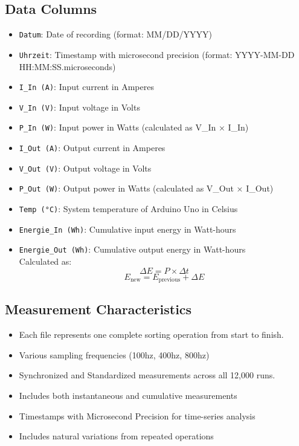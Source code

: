 \documentclass{article}
\begin{document}
\subsection{Data Columns}

\begin{itemize}
  \item \texttt{Datum}: Date of recording (format: MM/DD/YYYY)
  \item \texttt{Uhrzeit}: Timestamp with microsecond precision (format: YYYY-MM-DD HH:MM:SS.microseconds)
  \item \texttt{I\_In (A)}: Input current in Amperes
  \item \texttt{V\_In (V)}: Input voltage in Volts
  \item \texttt{P\_In (W)}: Input power in Watts (calculated as V\_In × I\_In)
  \item \texttt{I\_Out (A)}: Output current in Amperes
  \item \texttt{V\_Out (V)}: Output voltage in Volts
  \item \texttt{P\_Out (W)}: Output power in Watts (calculated as V\_Out × I\_Out)
  \item \texttt{Temp (°C)}: System temperature of Arduino Uno in Celsius
  \item \texttt{Energie\_In (Wh)}: Cumulative input energy in Watt-hours 
  \item \texttt{Energie\_Out (Wh)}: Cumulative output energy in Watt-hours
  \\
    \noindent\hspace*{3.2cm}Calculated as:
\[
\Delta E = P \times \Delta t
\]
\[
E_{\text{new}} = E_{\text{previous}} + \Delta E
\]
\end{itemize}

\subsection{Measurement Characteristics}

\begin{itemize}
  \item Each file represents one complete sorting operation from start to finish.
  \item Various sampling frequencies (100hz, 400hz, 800hz)
  \item Synchronized and Standardized measurements across all 12,000 runs.
  \item Includes both instantaneous and cumulative measurements
  \item Timestamps with Microsecond Precision for time-series analysis
  \item Includes natural variations from repeated operations
\end{itemize}
\end{document}
